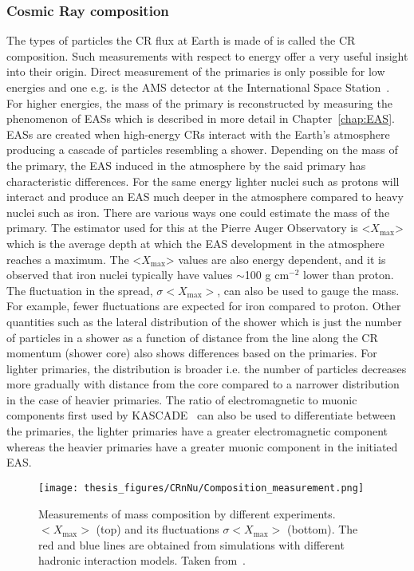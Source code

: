 \subsubsection*{Cosmic Ray composition}
\label{subsubsec:CRcompo}
The types of particles the \gls{CR} flux at Earth is made of is called the \gls*{CR} composition. Such measurements with respect to energy offer a very useful insight into their origin. Direct measurement of the primaries is only possible for low energies and one e.g. is the AMS detector at the International Space Station~\cite{PhysRevLett.110.141102}. For higher energies, the mass of the primary is reconstructed by measuring the phenomenon of \glspl{EAS} which is described in more detail in Chapter~\ref{chap:EAS}. \glspl*{EAS} are created when high-energy \glspl{CR} interact with the Earth's atmosphere producing a cascade of particles resembling a shower.  Depending on the mass of the primary, the \gls{EAS} induced in the atmosphere by the said primary has characteristic differences. For the same energy lighter nuclei such as protons will interact and produce an \gls{EAS} much deeper in the atmosphere compared to heavy nuclei such as iron. There are various ways one could estimate the mass of the primary. The estimator used for this at the Pierre Auger Observatory is <$X_{\text{max}}$> which is the average depth at which the \gls{EAS} development in the atmosphere reaches a maximum. The <$X_{\text{max}}$> values are also energy dependent, and it is observed that iron nuclei typically have values $\sim$100 g cm$^{-2}$ lower than proton. The fluctuation in the spread, $\sigma<X_{\text{max}}>$, can also be used to gauge the mass. For example, fewer fluctuations are expected for iron compared to proton. Other quantities such as the lateral distribution of the shower which is just the number of particles in a shower as a function of distance from the line along the CR momentum (shower core) also shows differences based on the primaries. For lighter primaries, the distribution is broader i.e. the number of particles decreases more gradually with distance from the core compared to a narrower distribution in the case of heavier primaries. The ratio of electromagnetic to muonic components first used by KASCADE~\cite{SCHATZ1998151} can also be used to differentiate between the primaries, the lighter primaries have a greater electromagnetic component whereas the heavier primaries have a greater muonic component in the initiated EAS.    

\begin{figure}[t!]
  \centering
  \texttt{[image: thesis\_figures/CRnNu/Composition\_measurement.png]}
  \caption{Measurements of mass composition by different experiments. $<X_{\text{max}}>$ (top) and its fluctuations $\sigma<X_{\text{max}}>$ (bottom). The red and blue lines are obtained from simulations with different hadronic interaction models. Taken from~\cite{ParticleDataGroup:2024cfk}.}
  \label{fig:CR-composition}
\end{figure}

